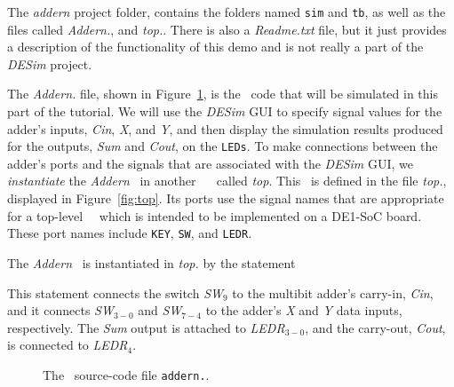 \clearpage
\newpage
The {\it addern} project folder, contains the 
folders named \texttt{sim} and \texttt{tb}, as well as the files called {\it Addern.\hdlFileExt}, 
and {\it top.\hdlFileExt}. There is also a {\it Readme.txt} file, but it just provides 
a description of the functionality of this demo and is not really a part of the {\it DESim} project. 

The {\it Addern.\hdlFileExt} file, shown in Figure~\ref{fig:addern}, is the \hdlName~code that will 
be simulated in this part of the tutorial. We will use the {\it DESim} GUI to specify signal 
values for the adder's inputs, {\it Cin}, {\it X}, and {\it Y}, and then display the
simulation results produced for the outputs, {\it Sum} and {\it Cout}, on the \texttt{LEDs}. 
To make connections between the adder's ports and the signals that are associated with the
{\it DESim} GUI, we {\it instantiate} the {\it Addern} \hdlModuleName~in another \hdlName~\hdlModuleName~
called {\it top}. This \hdlModuleName~is defined in the file {\it top.\hdlFileExt}, displayed in 
Figure~\ref{fig:top}. Its ports use the signal names that are appropriate for a
top-level \hdlName~\hdlModuleName~which is intended to be implemented on a DE1-SoC board. These
port names include \texttt{KEY}, \texttt{SW}, and  \texttt{LEDR}.

The {\it Addern} \hdlModuleName~is instantiated in {\it top.\hdlFileExt} by the statement
	{}
	{}

This statement connects the switch {\it SW}$_9$ to the multibit adder's carry-in, {\it Cin}, 
and it connects {\it SW}$_{3-0}$ and  {\it SW}$_{7-4}$ to the adder's {\it X} and {\it Y} 
data inputs, respectively.  The {\it Sum} output is attached to {\it LEDR}$_{3-0}$, and 
the carry-out, {\it Cout}, is connected to {\it LEDR}$_4$.

\begin{figure}[h]
\begin{center}
\begin{minipage}[h]{15 cm}
	{}
	{}
\end{minipage}
	\caption{The \hdlName~source-code file \texttt{addern.\hdlFileExt}.}
	\label{fig:addern}
\end{center}
\end{figure}

